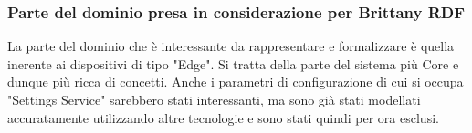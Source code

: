 
\subsubsection{Parte del dominio presa in considerazione per Brittany RDF}
\noindent La parte del dominio che è interessante da rappresentare e formalizzare è quella inerente ai dispositivi di tipo "Edge". Si tratta della parte del sistema più Core e dunque più ricca di concetti. \newline
Anche i parametri di configurazione di cui si occupa "Settings Service" sarebbero stati interessanti, ma sono già stati modellati accuratamente utilizzando altre tecnologie e sono stati quindi per ora esclusi.

